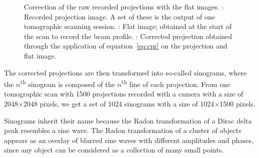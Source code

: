 \begin{figure}[h]
{		\label{subfig:fi}%
		}%
	\caption[Correction of the projections with flat images]{Correction of the raw recorded projections with the flat images. : Recorded projection image. A set of these is the output of one tomographic scanning session. : Flat image; obtained at the start of the scan to record the beam profile. : Corrected projection obtained through the application of equation~\ref{eq:cpr} on the projection and flat image.}
	\label{fig:corrected projection}
\end{figure}

The corrected projections are then transformed into so-called sinograms, where the $n$\textsuperscript{th} sinogram is composed of the $n$\textsuperscript{th} line of each projection. From one tomographic scan with 1500 projections recorded with a camera with a size of 2048$\times$2048 pixels, we get a set of 1024 sinograms with a size of 1024$\times$1500 pixels.

Sinograms inherit their name because the Radon transformation of a Dirac delta peak resembles a sine wave. The Radon transformation of a cluster of objects appears as an overlay of blurred sine waves with different amplitudes and phases, since any object  can be considered as a collection of many small points.

